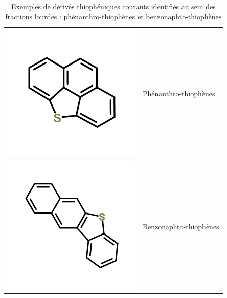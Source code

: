 \documentclass[12pt,a4paper]{book}
\begin{document}
\begin{table}[h!]
	\begin{center}
		\begin{tabular}{rl}
			\hline
			\includegraphics[scale=0.4]{../image/phenanthro-thiophene} & Phénanthro-thiophènes \\
			\includegraphics[scale=0.4]{../image/benzo-naphto-thiophene} & Benzonaphto-thiophènes \\
			\hline 
		\end{tabular}
	\end{center}
	\caption{Exemples de dérivés thiophéniques courants identifiés au sein des fractions lourdes : phénanthro-thiophènes et benzonaphto-thiophènes}
	\label{tab:soufre-ex}
\end{table}
\end{document}

